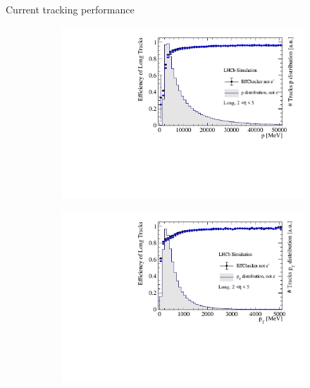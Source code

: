 \documentclass[xcolor={dvipsnames}]{beamer}
\begin{document}
\begin{frame}{Current tracking performance}
  \vspace{0.0cm}
  \begin{figure}[htb]
    \centering
    \begin{subfigure}{0.45\textwidth}
      \includegraphics[width=1\textwidth]{Plots/TrackEfficiency_p_old_new_MC_comparison.pdf}
    \end{subfigure}%
    \begin{subfigure}{0.45\textwidth}
      \includegraphics[width=1\textwidth]{Plots/TrackEfficiency_pt_old_new_MC_comparison.pdf}
    \end{subfigure}
    \begin{subfigure}{0.45\textwidth}

\end{subfigure}
\end{figure}
\end{frame}
\end{document}
